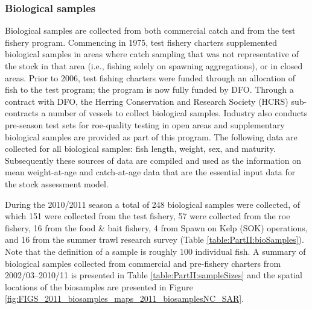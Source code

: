 	\subsubsection{Biological samples}
	
	Biological samples are collected from both commercial catch and from the test fishery program.  Commencing  in 1975, test fishery charters supplemented biological samples in areas where catch sampling that was not representative of the stock in that area (i.e., fishing solely on spawning aggregations), or in closed areas. Prior to 2006, test fishing charters were funded through an allocation of fish to the test program; the program is now fully funded by DFO.  Through a contract with DFO, the Herring Conservation and Research Society (HCRS) sub-contracts a number of vessels to collect biological samples.  Industry also conducts pre-season test sets for roe-quality testing in open areas and supplementary biological samples are provided as part of this program.  The following data are collected for all biological samples: fish length, weight, sex, and maturity.  Subsequently these sources of data are compiled and used as the information on mean weight-at-age and catch-at-age data that are the essential input data for the stock assessment model.
	
	During the 2010/2011 season a total of 248 biological samples were collected, of which 151 were collected from the test fishery, 57 were collected from the roe fishery, 16 from the food \& bait fishery, 4 from Spawn on Kelp (SOK) operations, and 16 from the summer trawl research survey (Table \ref{table:PartII:bioSamples}).  Note that the definition of a sample is roughly 100 individual fish.  A summary of biological samples collected from commercial and pre-fishery charters from 2002/03--2010/11 is presented in Table \ref{table:PartII:sampleSizes} and the spatial locations of the biosamples are presented in Figure \ref{fig:FIGS_2011_biosamples_maps_2011_biosamplesNC_SAR}.

